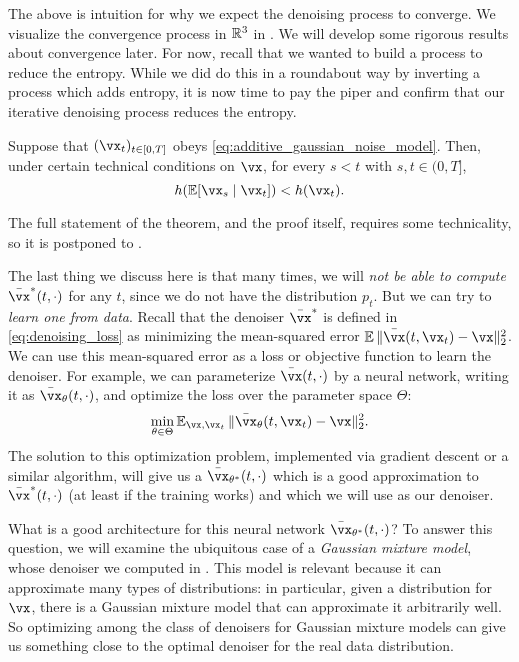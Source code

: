 \documentclass[../../book-main.tex]{subfiles}
\begin{document}
The above is intuition for why we expect the denoising process to converge. We visualize the convergence process in \(\mathbb{R}^{3}\) in . We will develop some rigorous results about convergence later. For now, recall that we wanted to build a process to reduce the entropy. While we did do this in a roundabout way by inverting a process which adds entropy, it is now time to pay the piper and confirm that our iterative denoising process reduces the entropy.

\begin{theorem}
	Suppose that \((\vx_{t})_{t \in [0, T]}\) obeys \eqref{eq:additive_gaussian_noise_model}. Then, under certain technical conditions on \(\vx\), for every \(s < t\) with \(s, t \in (0, T]\),
	\begin{equation}
		h(\Ex[\vx_{s} \mid \vx_{t}]) < h(\vx_{t}).
	\end{equation}
\end{theorem}
The full statement of the theorem, and the proof itself, requires some technicality, so it is postponed to .

The last thing we discuss here is that many times, we will \textit{not be able to compute} \(\bar{\vx}^{\ast}(t, \cdot)\) for any \(t\), since we do not have the distribution \(p_{t}\). But we can try to \textit{learn one from data}. Recall that the denoiser \(\bar{\vx}^{\ast}\) is defined in \eqref{eq:denoising_loss} as minimizing the mean-squared error \(\Ex\norm{\bar{\vx}(t, \vx_{t}) - \vx}_{2}^{2}\). We can use this mean-squared error as a loss or objective function to learn the denoiser. For example, we can parameterize \(\bar{\vx}(t, \cdot)\) by a neural network, writing it as \(\bar{\vx}_{\theta}(t, \cdot)\), and optimize the loss over the parameter space \(\Theta\):
\begin{equation}
	\min_{\theta \in \Theta}\Ex_{\vx, \vx_{t}}\norm{\bar{\vx}_{\theta}(t, \vx_{t}) - \vx}_{2}^{2}.
\end{equation}
The solution to this optimization problem, implemented via gradient descent or a similar algorithm, will give us a \(\bar{\vx}_{\theta^{\ast}}(t, \cdot)\) which is a good approximation to \(\bar{\vx}^{\ast}(t, \cdot)\) (at least if the training works) and which we will use as our denoiser.

What is a good architecture for this neural network \(\bar{\vx}_{\theta^{\ast}}(t, \cdot)\)? To answer this question, we will examine the ubiquitous case of a \textit{Gaussian mixture model},  whose denoiser we computed in . This model is relevant because it can approximate many types of distributions: in particular, given a distribution for \(\vx\), there is a Gaussian mixture model that can approximate it arbitrarily well. So optimizing among the class of denoisers for Gaussian mixture models can give us something close to the optimal denoiser for the real data distribution. 
\end{document}
